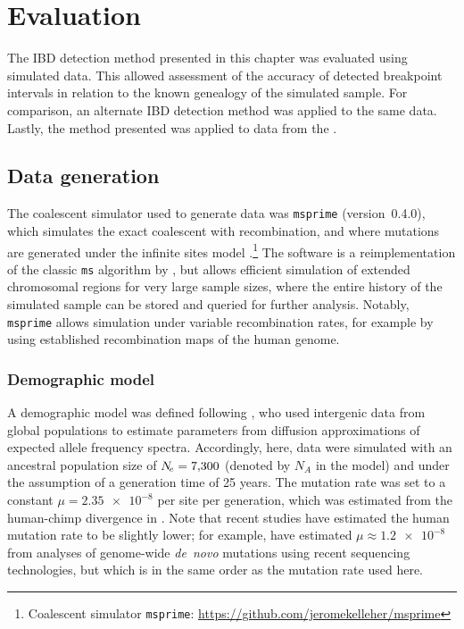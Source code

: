%
\section{Evaluation}
%

The IBD detection method presented in this chapter was evaluated using simulated data.
This allowed assessment of the accuracy of detected breakpoint intervals in relation to the known genealogy of the simulated sample.
For comparison, an alternate IBD detection method was applied to the same data.
Lastly, the method presented was applied to data from the .



%
\subsection{Data generation}
\label{sec:msprime}
%

The coalescent simulator used to generate data was \texttt{msprime} (version~{0.4.0}), which simulates the exact coalescent with recombination, and where mutations are generated under the infinite sites model \citep{Kelleher:2016fn}.\footnote{Coalescent simulator \texttt{msprime}: \url{https://github.com/jeromekelleher/msprime} }
The software is a reimplementation of the classic \texttt{ms} algorithm by \citet{Hudson:2002vy}, but allows efficient simulation of extended chromosomal regions for very large sample sizes, where the entire history of the simulated sample can be stored and queried for further analysis.
Notably, \texttt{msprime} allows simulation under variable recombination rates, for example by using established recombination maps of the human genome.


%
\subsubsection{Demographic model}
\label{sec:sim_demo_model}
%

A demographic model was defined following \citet{Gutenkunst:2009gs}, who used intergenic data from  global populations to estimate parameters from diffusion approximations of expected allele frequency spectra.
Accordingly, here, data were simulated with an ancestral population size of ${N_{\!e} = \num{7300}}$ (denoted by $N_A$ in the model) and under the assumption of a generation time of 25 years.
The mutation rate was set to a constant ${\mu = \num[round-precision=2]{2.35e-8}}$ per site per generation, which was estimated from the human-chimp divergence in \citet{Gutenkunst:2009gs}.
Note that recent studies have estimated the human mutation rate to be slightly lower; for example, \citet{Scally:2012fe} have estimated ${\mu \approx \num[round-precision=1]{1.2e-8}}$ from analyses of genome-wide \emph{de~novo} mutations using recent sequencing technologies, but which is in the same order as the mutation rate used here.

